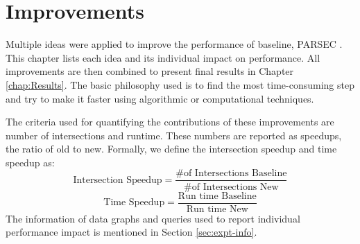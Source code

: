 \chapter{Improvements}{\label{chap:Improvements}
Multiple ideas were applied to improve the performance of baseline, PARSEC \cite{PARSEC_VD}.
This chapter lists each idea and its individual impact on performance.
All improvements are then combined to present final results in Chapter \ref{chap:Results}.
The basic philosophy used is to find the most time-consuming step and try to make it faster using algorithmic or computational techniques.

The criteria used for quantifying the contributions of these improvements are number of intersections and runtime.
These numbers are reported as speedups, the ratio of old to new.
Formally, we define the intersection speedup and time speedup as:
$$
    \text{Intersection Speedup} = \frac{\text{\# of Intersections Baseline}}{\text{\# of Intersections New}}
$$
$$
    \text{Time Speedup} = \frac{\text{Run time Baseline}}{\text{Run time New}}
$$
The information of data graphs and queries used to report individual performance impact is mentioned in Section \ref{sec:expt-info}.

}

